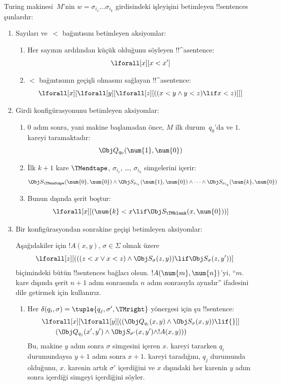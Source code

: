 Turing makinesi~$M$'nin $w=\sigma_{i_1}\dots\sigma_{i_k}$ girdisindeki
işleyişini betimleyen !!{sentence}s şunlardır:
\begin{enumerate}
\item Sayıları ve~$<$ bağıntısını betimleyen aksiyomlar:
\begin{enumerate}
\item Her sayının ardılından küçük olduğunu söyleyen !!^a{sentence}:
\[
\lforall[x][x < x']
\]
\item $<$ bağıntısının geçişli olmasını sağlayan !!^a{sentence}:
\[
\lforall[x][\lforall[y][\lforall[z][
      ((x < y \land y < z) \lif x < z)]]]
\]
\end{enumerate}
\item Girdi konfigürasyonunu betimleyen aksiyomlar:
\begin{enumerate}
\item $0$ adım sonra, yani makine başlamadan önce, $M$ ilk durum~$q_0$'da ve
  $1$. kareyi taramaktadır:
\[
\Obj Q_{q_0}(\num{1}, \num{0})
\]
\item İlk $k+1$ kare $\TMendtape$, $\sigma_{i_1}$, \dots,
  $\sigma_{i_k}$ simgelerini içerir:
\[
\Obj S_\TMendtape(\num{0}, \num{0}) \land
\Obj S_{\sigma_{i_1}}(\num{1}, \num{0}) \land
\dots \land
\Obj S_{\sigma_{i_k}}(\num{k}, \num{0})
\]
\item Bunun dışında şerit boştur:
\[
\lforall[x][(\num{k} < x \lif \Obj S_\TMblank(x, \num{0}))]
\]
\end{enumerate}
\item Bir konfigürasyondan sonrakine geçişi betimleyen aksiyomlar:

Aşağıdakiler için $!A(x,y)$, $\sigma\in\Sigma$ olmak üzere
\[
\lforall[z][
  (((z < x \lor x < z) \land \Obj S_\sigma(z, y))
  \lif \Obj S_\sigma(z, y'))]
\]
biçimindeki bütün !!{sentence}s bağlacı olsun. $!A(\num{m},\num{n})$'yi,
``$m$. kare dışında şerit $n+1$ adım sonrasında $n$ adım sonrasıyla aynıdır''
ifadesini dile getirmek için kullanırız.
\begin{enumerate}
\item {} Her
$\delta(q_i,\sigma)=\tuple{q_j,\sigma',\TMright}$ yönergesi için şu
!!{sentence}:
\begin{align*}
& \lforall[x][\lforall[y][(
   (\Obj Q_{q_i}(x, y) \land \Obj S_{\sigma}(x, y)) \lif {}]] \\
&\qquad   (\Obj Q_{q_j}(x', y') \land \Obj S_{\sigma'}(x, y') \land
!A(x, y)))
\end{align*}
Bu, makine $y$ adım sonra $\sigma$ simgesini içeren $x$. kareyi tararken
$q_i$ durumundaysa $y+1$ adım sonra $x+1$. kareyi taradığını, $q_j$ durumunda
olduğunu, $x$. karenin artık $\sigma'$ içerdiğini ve $x$ dışındaki her
karenin $y$ adım sonra içerdiği simgeyi içerdiğini söyler.


\end{enumerate}
\end{enumerate}
